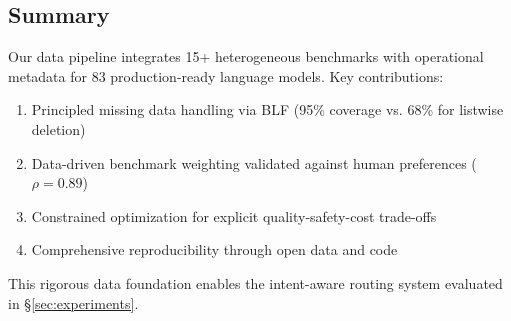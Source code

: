 \subsection{Summary}

Our data pipeline integrates 15+ heterogeneous benchmarks with operational metadata for 83 production-ready language models. Key contributions:
%
\begin{enumerate}[nosep]
\item Principled missing data handling via BLF (95\% coverage vs. 68\% for listwise deletion)
\item Data-driven benchmark weighting validated against human preferences ($\rho = 0.89$)
\item Constrained optimization for explicit quality-safety-cost trade-offs
\item Comprehensive reproducibility through open data and code
\end{enumerate}
%
This rigorous data foundation enables the intent-aware routing system evaluated in §\ref{sec:experiments}.
